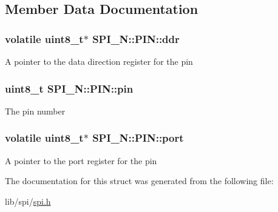 \subsection{Member Data Documentation}
\hypertarget{struct_s_p_i___n_1_1_p_i_n_a6ccc89a50bb2562bacdd839edd2442c5}{
\subsubsection[{ddr}]{\setlength{\rightskip}{0pt plus 5cm}volatile uint8\-\_\-t$\ast$ S\-P\-I\-\_\-\-N\-::\-P\-I\-N\-::ddr}}\label{struct_s_p_i___n_1_1_p_i_n_a6ccc89a50bb2562bacdd839edd2442c5}
A pointer to the data direction register for the pin \hypertarget{struct_s_p_i___n_1_1_p_i_n_abb2cb9d43e5af9fe7d59df75aca39b0b}{
\subsubsection[{pin}]{\setlength{\rightskip}{0pt plus 5cm}uint8\-\_\-t S\-P\-I\-\_\-\-N\-::\-P\-I\-N\-::pin}}\label{struct_s_p_i___n_1_1_p_i_n_abb2cb9d43e5af9fe7d59df75aca39b0b}
The pin number \hypertarget{struct_s_p_i___n_1_1_p_i_n_ae1d5f750e364d99dfa888bf2042fa6c2}{
\subsubsection[{port}]{\setlength{\rightskip}{0pt plus 5cm}volatile uint8\-\_\-t$\ast$ S\-P\-I\-\_\-\-N\-::\-P\-I\-N\-::port}}\label{struct_s_p_i___n_1_1_p_i_n_ae1d5f750e364d99dfa888bf2042fa6c2}
A pointer to the port register for the pin 

The documentation for this struct was generated from the following file\-:\begin{DoxyCompactItemize}
\item 
lib/spi/\hyperlink{spi_8h}{spi.\-h}\end{DoxyCompactItemize}
